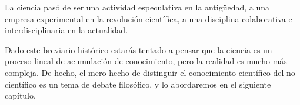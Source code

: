 \begin{remember}
	\label{rem:historia-preguntas}
	La ciencia pasó de ser una actividad especulativa en la antigüedad, a una empresa experimental en la revolución científica, a una disciplina colaborativa e interdisciplinaria en la actualidad.
\end{remember}

Dado este breviario histórico estarás tentado a pensar que la ciencia es un proceso lineal de acumulación de conocimiento, pero la realidad es mucho más compleja.
De hecho, el mero hecho de distinguir el conocimiento científico del no científico es un tema de debate filosófico, y lo abordaremos en el siguiente capítulo.